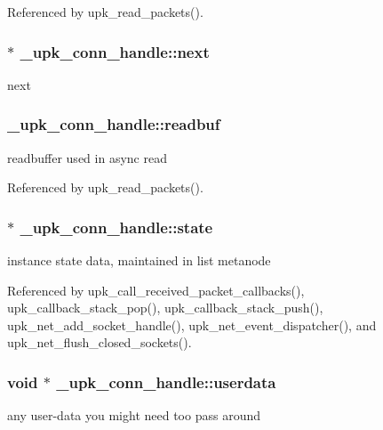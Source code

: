 Referenced by upk\_\-read\_\-packets().

\subsubsection[{next}]{ $\ast$ {\bf \_\-upk\_\-conn\_\-handle::next}}\label{struct__upk__conn__handle_ad71e1d46472d9951ec6fe7f5f07009cd}
next 
\subsubsection[{readbuf}]{ {\bf \_\-upk\_\-conn\_\-handle::readbuf}}\label{struct__upk__conn__handle_aa1f48bbb03d4f15e2358421f20d42cde}
readbuffer used in async read 

Referenced by upk\_\-read\_\-packets().

\subsubsection[{state}]{ $\ast$ {\bf \_\-upk\_\-conn\_\-handle::state}}\label{struct__upk__conn__handle_acd095111e3608c83eadb146fff94e0c3}
instance state data, maintained in list metanode 

Referenced by upk\_\-call\_\-received\_\-packet\_\-callbacks(), upk\_\-callback\_\-stack\_\-pop(), upk\_\-callback\_\-stack\_\-push(), upk\_\-net\_\-add\_\-socket\_\-handle(), upk\_\-net\_\-event\_\-dispatcher(), and upk\_\-net\_\-flush\_\-closed\_\-sockets().

\subsubsection[{userdata}]{\setlength{\rightskip}{0pt plus 5cm}void $\ast$ {\bf \_\-upk\_\-conn\_\-handle::userdata}}\label{struct__upk__conn__handle_af16e081a55262dc84ac0d106c5c47ce5}
any user-\/data you might need too pass around 

